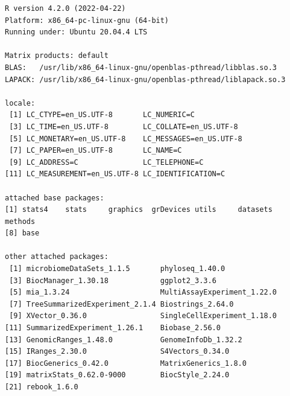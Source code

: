 \documentclass[
]{book}
\begin{document}
\begin{verbatim}
R version 4.2.0 (2022-04-22)
Platform: x86_64-pc-linux-gnu (64-bit)
Running under: Ubuntu 20.04.4 LTS

Matrix products: default
BLAS:   /usr/lib/x86_64-linux-gnu/openblas-pthread/libblas.so.3
LAPACK: /usr/lib/x86_64-linux-gnu/openblas-pthread/liblapack.so.3

locale:
 [1] LC_CTYPE=en_US.UTF-8       LC_NUMERIC=C              
 [3] LC_TIME=en_US.UTF-8        LC_COLLATE=en_US.UTF-8    
 [5] LC_MONETARY=en_US.UTF-8    LC_MESSAGES=en_US.UTF-8   
 [7] LC_PAPER=en_US.UTF-8       LC_NAME=C                 
 [9] LC_ADDRESS=C               LC_TELEPHONE=C            
[11] LC_MEASUREMENT=en_US.UTF-8 LC_IDENTIFICATION=C       

attached base packages:
[1] stats4    stats     graphics  grDevices utils     datasets  methods  
[8] base     

other attached packages:
 [1] microbiomeDataSets_1.1.5       phyloseq_1.40.0               
 [3] BiocManager_1.30.18            ggplot2_3.3.6                 
 [5] mia_1.3.24                     MultiAssayExperiment_1.22.0   
 [7] TreeSummarizedExperiment_2.1.4 Biostrings_2.64.0             
 [9] XVector_0.36.0                 SingleCellExperiment_1.18.0   
[11] SummarizedExperiment_1.26.1    Biobase_2.56.0                
[13] GenomicRanges_1.48.0           GenomeInfoDb_1.32.2           
[15] IRanges_2.30.0                 S4Vectors_0.34.0              
[17] BiocGenerics_0.42.0            MatrixGenerics_1.8.0          
[19] matrixStats_0.62.0-9000        BiocStyle_2.24.0              
[21] rebook_1.6.0                  


\end{verbatim}
\end{document}
